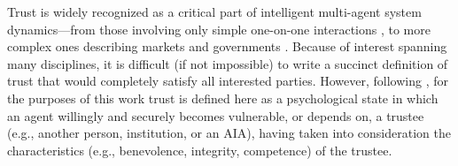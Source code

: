 Trust is widely recognized as a critical part of %
intelligent multi-agent system dynamics---from those involving only simple one-on-one interactions \cite{Lewicki2006-hj}, to more complex ones describing markets and governments \cite{Fukuyama1995-un}. 
Because of interest spanning many disciplines, it is difficult (if not impossible) to write a succinct definition of trust that would completely satisfy all interested parties. 
However, following \cite{McKnight2004-vv}, for the purposes of this work trust is defined here as a psychological state in which an agent willingly and securely becomes vulnerable, or depends on, a trustee (e.g., another person, institution, or an AIA), having taken into consideration the characteristics (e.g., benevolence, integrity, competence) of the trustee. 

